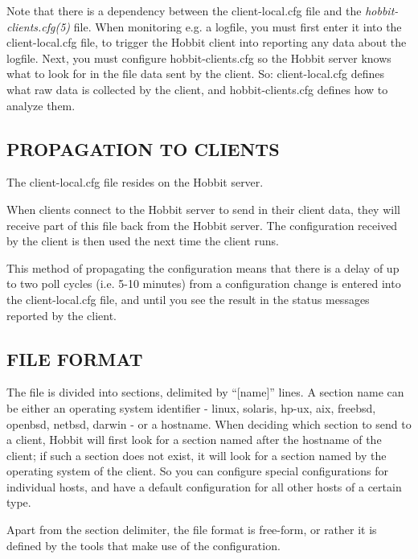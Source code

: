   Note that there is a dependency between the client-local.cfg file
  and the \emph{hobbit-clients.cfg(5)} file. When monitoring e.g. a
  logfile, you must first enter it into the client-local.cfg file, to
  trigger the Hobbit client into reporting any data about the
  logfile. Next, you must configure hobbit-clients.cfg so the Hobbit
  server knows what to look for in the file data sent by the
  client. So: client-local.cfg defines what raw data is collected by
  the client, and hobbit-clients.cfg defines how to analyze them. 



 
\subsection{PROPAGATION TO CLIENTS}
 The client-local.cfg file resides on the Hobbit server. 

  When clients connect to the Hobbit server to send in their client
  data, they will receive part of this file back from the Hobbit
  server. The configuration received by the client is then used the
  next time the client runs. 



  This method of propagating the configuration means that there is a
  delay of up to two poll cycles (i.e. 5-10 minutes) from a
  configuration change is entered into the client-local.cfg file, and
  until you see the result in the status messages reported by the
  client. 



 
\subsection{FILE FORMAT}
 The file is divided into sections, delimited by ``[name]'' lines. A
 section name can be either an operating system identifier - linux,
 solaris, hp-ux, aix, freebsd, openbsd, netbsd, darwin - or a
 hostname. When deciding which section to send to a client, Hobbit
 will first look for a section named after the hostname of the client;
 if such a section does not exist, it will look for a section named by
 the operating system of the client. So you can configure special
 configurations for individual hosts, and have a default configuration
 for all other hosts of a certain type. 


  Apart from the section delimiter, the file format is free-form, or
  rather it is defined by the tools that make use of the
  configuration. 




